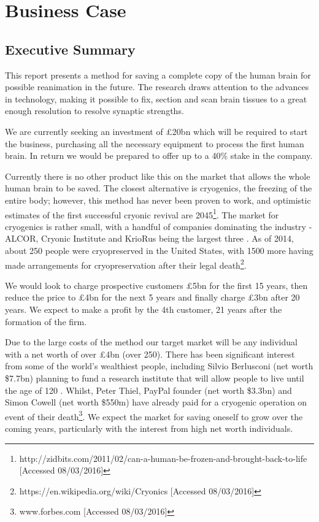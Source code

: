 \documentclass[a4paper, 11pt]{article}
\numberwithin{equation}{section}
\begin{document}
		
		\newpage
			
		\clearpage
			
	\pagestyle{alex}
	
\section{Business Case}
\label{Business_Case}
\subsection{Executive Summary}

This report presents a method for saving a complete copy of the human brain for possible reanimation in the future. The research draws attention to the advances in technology, making it possible to fix, section and scan brain tissues to a great enough resolution to resolve synaptic strengths. 

We are currently seeking an investment of \pounds 20bn which will be required to start the business, purchasing all the necessary equipment to process the first human brain. In return we would be prepared to offer up to a 40\% stake in the company. 

Currently there is no other product like this on the market that allows the whole human brain to be saved. The closest alternative is cryogenics, the freezing of the entire body; however, this method has never been proven to work, and optimistic estimates of the first successful cryonic revival are 2045\footnote{http://zidbits.com/2011/02/can-a-human-be-frozen-and-brought-back-to-life [Accessed 08/03/2016]}. The market for cryogenics is rather small, with a handful of companies dominating the industry - ALCOR, Cryonic Institute and KrioRus being the largest three \cite{ftcryonics}. As of 2014, about 250 people were cryopreserved in the United States, with 1500 more having made arrangements for cryopreservation after their legal death\footnote{https://en.wikipedia.org/wiki/Cryonics [Accessed 08/03/2016]}.

We would look to charge prospective customers \pounds 5bn for the first 15 years, then reduce the price to \pounds 4bn for the next 5 years and finally charge \pounds 3bn after 20 years. We expect to make a profit by the 4th customer, 21 years after the formation of the firm. 

Due to the large costs of the method our target market will be any individual with a net worth of over \pounds 4bn (over 250). There has been significant interest from some of the world's wealthiest people, including Silvio Berlusconi (net worth \$7.7bn) planning to fund a research institute that will allow people to live until the age of 120 \cite{ftcryonics}. Whilst, Peter Thiel, PayPal founder (net worth \$3.3bn) and Simon Cowell (net worth \$550m) have already paid for a cryogenic operation on event of their death\footnote{www.forbes.com [Accessed 08/03/2016]}. We expect the market for saving oneself to grow over the coming years, particularly with the interest from high net worth individuals. 
\end{document}
